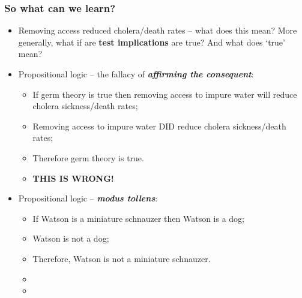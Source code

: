 \documentclass[aspectratio=169]{beamer}
\theoremstyle{principle}
\begin{document}
\begin{frame}
\frametitle{So what can we learn?}
\begin{itemize}
\item Removing access reduced cholera/death rates -- what does this mean?  More generally, what if are \textbf{test implications} are true?  And what does `true' mean?
\bigskip
\item Propositional logic -- the fallacy of \textit{\textbf{affirming the consequent}}:
\begin{itemize}
\item If germ theory is true then removing access to impure water will reduce cholera sickness/death rates;
\item Removing access to impure water DID reduce cholera sickness/death rates;
\item Therefore germ theory is true.
\item \textbf{THIS IS WRONG!}
\end{itemize}
\bigskip
\item Propositional logic -- \textit{\textbf{modus tollens}}:
\begin{itemize}
\item If Watson is a miniature schnauzer then Watson is a dog;
\item Watson is not a dog;
\item Therefore, Watson is not a miniature schnauzer.
\item[]
\item[]
 \end{itemize}
\end{itemize}

\end{frame}
\end{document}
